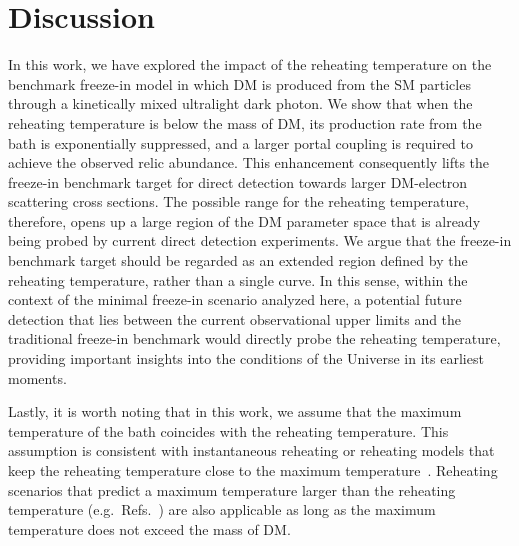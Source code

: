 \section{Discussion}
\label{sec:ch8-discussion}

In this work, we have explored the impact of the reheating temperature on the benchmark freeze-in model in which DM is produced from the SM particles through a kinetically mixed ultralight dark photon. We show that when the reheating temperature is below the mass of DM, its production rate from the bath is exponentially suppressed, and a larger portal coupling is required to achieve the observed relic abundance. This enhancement consequently lifts the freeze-in benchmark target for direct detection towards larger DM-electron scattering cross sections. The possible range for the reheating temperature, therefore, opens up a large region of the DM parameter space that is already being probed by current direct detection experiments. We argue that the freeze-in benchmark target should be regarded as an extended region defined by the reheating temperature, rather than a single curve.  In this sense, within the context of the minimal freeze-in scenario analyzed here, a potential future detection that lies between the current observational upper limits and the traditional freeze-in benchmark would directly probe the reheating temperature, providing important insights into the conditions of the Universe in its earliest moments.

Lastly, it is worth noting that in this work, we assume that the maximum temperature of the bath coincides with the reheating temperature. This assumption is consistent with instantaneous reheating or reheating models that keep the reheating temperature close to the maximum temperature~\cite{Co:2020xaf,Cosme:2023xpa,Cosme:2024ndc, Barman:2024mqo}. Reheating scenarios that predict a maximum temperature larger than the reheating temperature (e.g.\ Refs.~\cite{Chung:1998rq,Giudice:2000ex,Kolb:2003ke}) are also applicable as long as the maximum temperature does not exceed the mass of DM.